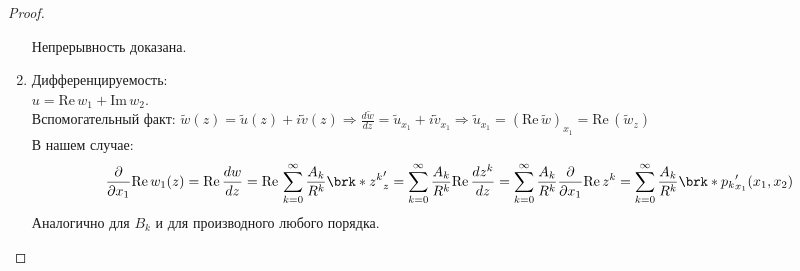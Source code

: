 \begin{proof}
\begin{enumerate}
Непрерывность доказана.
\item Дифференцируемость:\\ 
$u = \mathrm{Re}\, w_1 + \mathrm{Im}\, w_2$.\\
Вспомогательный факт: $\tilde{w}(z) = \tilde{u}(z) + i \tilde{v}(z) \Rightarrow \frac{d \tilde{w}}{d z} = \tilde{u}_{x_1} + i \tilde{v}_{x_1} \Rightarrow  \tilde{u}_{x_1} = (\mathrm{Re}\, \tilde{w})_{x_1} = \mathrm{Re}\, (\tilde{w}_z)$\\
В нашем случае: 
\[
\pd{}{x_1} \mathrm{Re}\, w_1(z) = \mathrm{Re}\, \frac{dw}{dz} = \mathrm{Re}\, \sum_{k=0}^{\infty} \frac{A_k}{R^k}\brk*{z^k}'_z = \sum_{k=0}^{\infty} \frac{A_k}{R^k}\mathrm{Re}\, \frac{dz^k}{dz} = \sum_{k=0}^{\infty} \frac{A_k}{R^k}\pd{}{x_1}\mathrm{Re}\,z^k = \sum_{k=0}^{\infty} \frac{A_k}{R^k}\brk*{p_k}'_{x_1}(x_1,x_2)
\]
Аналогично для $B_k$ и для производного любого порядка.
\end{enumerate}
\end{proof}